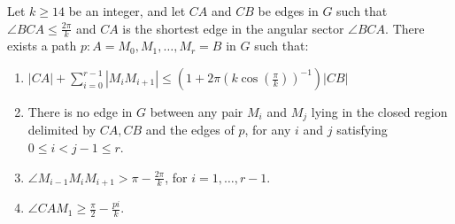 \begin{lemma}
Let $k \geq 14$ be an integer, and let $CA $ and $CB $ be edges in $G $ such that $\angle{BCA} \leq \frac{2\pi}{k} $ and $CA $ is the shortest edge in the angular sector $\angle{BCA} $. There exists a path $p : A=M_0, M_1, \dotsc, M_r=B $ in $G $ such that:
\begin{enumerate}
\renewcommand{\labelenumi}{(\roman{enumi})}
\item $|CA| + \sum_{i=0}^{r-1}|M_iM_{i+1}| \leq (1+2\pi(k \cos(\frac{\pi}{k}))^{-1})|CB|$
\item There is no edge in $G $ between any pair $M_i $ and $M_j $ lying in the closed region delimited by $CA, CB $ and the edges of $p $, for any $i $ and $j $ satisfying $0 \leq i < j -1 \leq r $.
\item $\angle{M_{i-1}M_iM_{i+1}} > \pi - \frac{2\pi}{k} $, for $i=1,\dotsc,r-1 $.
\item $\angle{CAM_1} \geq \frac{\pi}{2} - \frac{pi}{k} $.
\end{enumerate}	 
\end{lemma}

